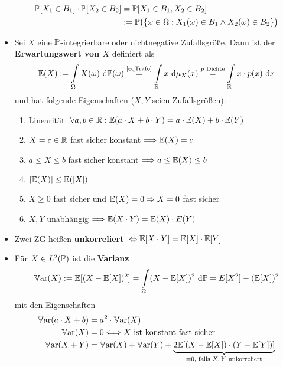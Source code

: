 \begin{itemize}
\begin{align*}
\P[X_1\in B_1]\cdot \P[X_2\in B_2]
&=
\P[X_1\in B_1, X_2\in B_2]\\
&:=\P\big(\lbrace\omega\in\Omega:X_1(\omega)\in B_1\wedge X_2(\omega)\in B_2\rbrace\big)
\end{align*}
\item Sei $X$ eine $\P$-integrierbare oder nichtnegative Zufallsgröße. Dann ist der \textbf{Erwartungswert von $X$} definiert als
\begin{align*}
\E(X):=\int\limits_\Omega X(\omega)\d\P(\omega)
\stackeq{\text{\ref{eqTrafo}}}
\int\limits_\R x\d\mu_X (x)
\stackeq{p\text{ Dichte}}
\int\limits_\R x\cdot p(x)\d x
\end{align*}
und hat folgende Eigenschaften ($X,Y$ seien Zufallsgrößen):
\begin{enumerate}
\item Linearität: $\forall a,b\in\R:\E(a\cdot X+b\cdot Y)=a\cdot \E(X)+b\cdot\E(Y)$
\item $X=c\in\R$ fast sicher konstant $\Longrightarrow\E(X)=c$
\item $a\leq X\leq b$ fast sicher konstant $\Longrightarrow a\leq\E(X)\leq b$
\item $|\E(X)|\leq\E(|X|)$
\item $X\geq0$ fast sicher und $\E(X)=0\Rightarrow X=0$ fast sicher
\item $X,Y$ unabhängig $\Longrightarrow\E(X\cdot Y)=\E(X)\cdot E(Y)$
\end{enumerate}
\item Zwei ZG heißen \textbf{unkorreliert} $:\gdw\E[X\cdot Y]=\E[X]\cdot\E[Y]$
\item Für $X\in L^2(\P)$ ist die \textbf{Varianz} 
\begin{align*}
\Var(X):=\E[(X-\E[X])^2]=\int\limits_\Omega(X-\E[X])^2\d\P=E[X^2]-(\E[X])^2
\end{align*}
mit den Eigenschaften
\begin{align*}
\Var(a\cdot X+b)&=a^2\cdot\Var(X)\\
\Var(X)&=0\Longleftrightarrow X\text{ ist konstant fast sicher}\\
\Var(X+Y)&=\Var(X)+\Var(Y)+\underbrace{2\E[(X-\E[X])\cdot(Y-\E[Y])]}_{=0\text{, falls $X,Y$ unkorreliert}}
\end{align*}
\end{itemize}

